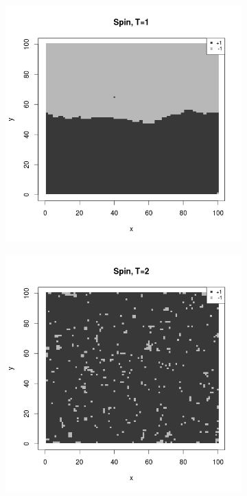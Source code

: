 \documentclass{scrartcl}
\begin{document}
\begin{figure}[ht]
\begin{subfigure}{.35\textwidth}
\end{subfigure}%
\begin{subfigure}{.35\textwidth}
  \centering
  \includegraphics[width=1\linewidth]{spins/spinT1doms}
\end{subfigure}
\begin{subfigure}{.35\textwidth}
  \centering
  \includegraphics[width=1\linewidth]{spins/spinT2+}

\end{subfigure}
\end{figure}
\end{document}
